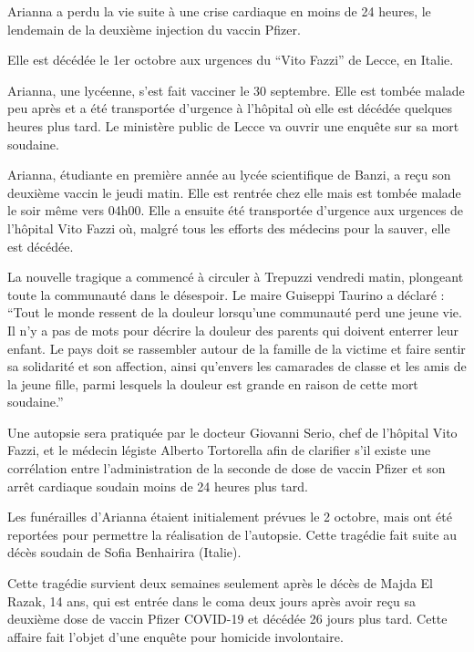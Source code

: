 Arianna a perdu la vie suite à une crise cardiaque en moins de 24 heures, le
lendemain de la deuxième injection du vaccin Pfizer.

Elle est décédée le 1er octobre aux urgences du “Vito Fazzi” de Lecce, en
Italie.

Arianna, une lycéenne, s'est fait vacciner le 30 septembre. Elle est tombée
malade peu après et a été transportée d'urgence à l'hôpital où elle est décédée
quelques heures plus tard. Le ministère public de Lecce va ouvrir une enquête
sur sa mort soudaine.

Arianna, étudiante en première année au lycée scientifique de Banzi, a reçu son
deuxième vaccin le jeudi matin. Elle est rentrée chez elle mais est tombée
malade le soir même vers 04h00. Elle a ensuite été transportée d'urgence aux
urgences de l'hôpital Vito Fazzi où, malgré tous les efforts des médecins pour
la sauver, elle est décédée.

La nouvelle tragique a commencé à circuler à Trepuzzi vendredi matin, plongeant
toute la communauté dans le désespoir. Le maire Guiseppi Taurino a déclaré :
“Tout le monde ressent de la douleur lorsqu'une communauté perd une jeune
vie. Il n'y a pas de mots pour décrire la douleur des parents qui doivent
enterrer leur enfant. Le pays doit se rassembler autour de la famille de la
victime et faire sentir sa solidarité et son affection, ainsi qu'envers les
camarades de classe et les amis de la jeune fille, parmi lesquels la douleur est
grande en raison de cette mort soudaine.”

Une autopsie sera pratiquée par le docteur Giovanni Serio, chef de l'hôpital
Vito Fazzi, et le médecin légiste Alberto Tortorella afin de clarifier s'il
existe une corrélation entre l'administration de la seconde de dose de vaccin
Pfizer et son arrêt cardiaque soudain moins de 24 heures plus tard.

Les funérailles d'Arianna étaient initialement prévues le 2 octobre, mais ont
été reportées pour permettre la réalisation de l'autopsie. Cette tragédie fait
suite au décès soudain de Sofia Benhairira (Italie).

Cette tragédie survient deux semaines seulement après le décès de Majda El
Razak, 14 ans, qui est entrée dans le coma deux jours après avoir reçu sa
deuxième dose de vaccin Pfizer COVID-19 et décédée 26 jours plus tard. Cette
affaire fait l'objet d'une enquête pour homicide involontaire.

